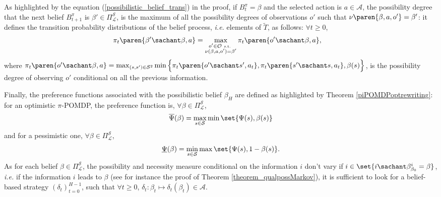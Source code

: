 As highlighted by the equation (\ref{possibilistic_belief_trans}) in the proof, if $B^{\pi}_t=\beta$
and the selected action is $a \in \mathcal{A}$, 
the possibility degree that the next belief $B^{\pi}_{t+1}$ is $\beta' \in \Pi^{\mathcal{S}}_{\mathcal{L}}$, 
is the maximum of all the possibility degrees of observations $o'$
such that $\nu \paren{\beta,a,o'}=\beta'$: 
it defines the transition probability distributions of the belief process,
\textit{i.e.} elements of $\tilde{T}$, as follows: $\forall t \geqslant 0$,
\begin{align}
\label{transition_possibilistic_belief} \pi_t \paren{ \beta' \sachant \beta,a} &= \max_{ \substack{ o' \in \mathcal{O} \mbox{ \tiny s.t. } \\ \nu(\beta,a,o') = \beta'} } \pi_t \paren{ o' \sachant \beta, a },
\end{align}
where $\pi_t \paren{ o' \sachant \beta, a } = \max_{(s,s') \in \mathcal{S}^2} \min \Big\{ \pi_t \paren{ o' \sachant s', a_t }, \pi_t \paren{ s' \sachant s, a_t }, \beta(s) \Big\}$,
is the possibility degree of observing $o'$ conditional on all the previous information.

Finally, the preference functions associated with the possibilistic belief $\beta_H$ are defined as
highlighted by Theorem \ref{piPOMDPoptrewriting}: for an optimistic $\pi$-POMDP, the preference function is, $\forall \beta \in \Pi^{\mathcal{S}}_{\mathcal{L}}$,
\begin{equation}
\label{opt_preference}
 \overline{\Psi}(\beta) = \max_{s\in\mathcal{S}} \min \set{ \Psi(s), \beta(s) } 
\end{equation}
and for a pessimistic one, $\forall \beta \in \Pi^{\mathcal{S}}_{\mathcal{L}}$,
\begin{equation}
\label{pess_preference}
 \underline{\Psi}(\beta) = \min_{s\in \mathcal{S}} \max \set{ \Psi(s), 1 - \beta(s) }.
\end{equation}
As for each belief $\beta \in \Pi^{\mathcal{S}}_{\mathcal{L}}$, 
the possibility and necessity measure conditional on the information $i$ 
don't vary if $i \in \set{ i \sachant \beta_{\beta_0}^{i} = \beta }$,
\textit{i.e.} if the information $i$ leads to $\beta$ (see for instance the proof of Theorem \ref{theorem_qualpossMarkov}),
it is sufficient to look for a belief-based strategy $(\delta_t)_{t=0}^{H-1}$,
such that $\forall t \geqslant 0$, $\delta_t: \beta_t \mapsto \delta_t(\beta_t) \in \mathcal{A}$.

